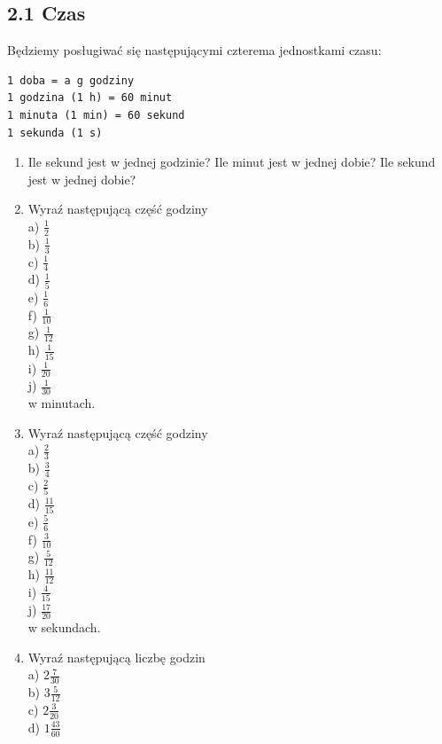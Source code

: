 \documentclass[10pt]{article}
\begin{document}
\subsection*{2.1 Czas}
Będziemy posługiwać się następującymi czterema jednostkami czasu:

\begin{verbatim}
1 doba = a g godziny
1 godzina (1 h) = 60 minut
1 minuta (1 min) = 60 sekund
1 sekunda (1 s)
\end{verbatim}

\begin{enumerate}
  \item Ile sekund jest w jednej godzinie? Ile minut jest w jednej dobie? Ile sekund jest w jednej dobie?
  \item Wyraź następującą część godziny\\
a) \(\frac{1}{2}\)\\
b) \(\frac{1}{3}\)\\
c) \(\frac{1}{4}\)\\
d) \(\frac{1}{5}\)\\
e) \(\frac{1}{6}\)\\
f) \(\frac{1}{10}\)\\
g) \(\frac{1}{12}\)\\
h) \(\frac{1}{15}\)\\
i) \(\frac{1}{20}\)\\
j) \(\frac{1}{30}\)\\
w minutach.
  \item Wyraź następującą część godziny\\
a) \(\frac{2}{3}\)\\
b) \(\frac{3}{4}\)\\
c) \(\frac{2}{5}\)\\
d) \(\frac{11}{15}\)\\
e) \(\frac{5}{6}\)\\
f) \(\frac{3}{10}\)\\
g) \(\frac{5}{12}\)\\
h) \(\frac{11}{12}\)\\
i) \(\frac{4}{15}\)\\
j) \(\frac{17}{20}\)\\
w sekundach.
  \item Wyraź następującą liczbę godzin\\
a) \(2 \frac{7}{30}\)\\
b) \(3 \frac{5}{12}\)\\
c) \(2 \frac{3}{20}\)\\
d) \(1 \frac{43}{60}\)\\

\end{enumerate}
\end{document}
